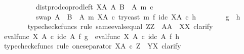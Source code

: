 \begin{isabellebody}
\ \ \ \ \ \ \ \ \ \ dist{\isacharunderscore}{\kern0pt}prod{\isacharunderscore}{\kern0pt}coprod{\isacharunderscore}{\kern0pt}left\ {\isacharparenleft}{\kern0pt}X\isactrlbsup A\isactrlesup {\isacharparenright}{\kern0pt}\ A\ {\isacharparenleft}{\kern0pt}B\ {\isasymsetminus}\ {\isacharparenleft}{\kern0pt}A{\isacharcomma}{\kern0pt}\ m{\isacharparenright}{\kern0pt}{\isacharparenright}{\kern0pt}\ {\isasymcirc}\isactrlsub c\isanewline
\ \ \ \ \ \ \ \ \ \ swap\ {\isacharparenleft}{\kern0pt}A\ {\isasymCoprod}\ {\isacharparenleft}{\kern0pt}B\ {\isasymsetminus}\ {\isacharparenleft}{\kern0pt}A{\isacharcomma}{\kern0pt}\ m{\isacharparenright}{\kern0pt}{\isacharparenright}{\kern0pt}{\isacharparenright}{\kern0pt}\ {\isacharparenleft}{\kern0pt}X\isactrlbsup A\isactrlesup {\isacharparenright}{\kern0pt}\ {\isasymcirc}\isactrlsub c\ try{\isacharunderscore}{\kern0pt}cast\ m\ {\isasymtimes}\isactrlsub f\ id\isactrlsub c\ {\isacharparenleft}{\kern0pt}X\isactrlbsup A\isactrlesup {\isacharparenright}{\kern0pt}{\isacharparenright}{\kern0pt}\isactrlsup {\isasymsharp}\ {\isasymcirc}\isactrlsub c\ h{\isachardoublequoteclose}\isanewline
\isanewline
\ \ \ \ \ \ \isamarkupfalse%
\ {\isachardoublequoteopen}g\ {\isacharequal}{\kern0pt}\ h{\isachardoublequoteclose}\isanewline
\ \ \ \ \ \ \isamarkupfalse%
\ {\isacharparenleft}{\kern0pt}typecheck{\isacharunderscore}{\kern0pt}cfuncs{\isacharcomma}{\kern0pt}\ rule\ same{\isacharunderscore}{\kern0pt}evals{\isacharunderscore}{\kern0pt}equal{\isacharbrackleft}{\kern0pt}\ Z{\isacharequal}{\kern0pt}Z{\isacharcomma}{\kern0pt}\ \ A{\isacharequal}{\kern0pt}A{\isacharcomma}{\kern0pt}\ \ X{\isacharequal}{\kern0pt}X{\isacharbrackright}{\kern0pt}{\isacharcomma}{\kern0pt}\ clarify{\isacharparenright}{\kern0pt}\isanewline
\ \ \ \ \ \ \ \ \isamarkupfalse%
\ {\isachardoublequoteopen}eval{\isacharunderscore}{\kern0pt}func\ X\ A\ {\isasymcirc}\isactrlsub c\ id\isactrlsub c\ A\ {\isasymtimes}\isactrlsub f\ g\ {\isacharequal}{\kern0pt}\ eval{\isacharunderscore}{\kern0pt}func\ X\ A\ {\isasymcirc}\isactrlsub c\ id\isactrlsub c\ A\ {\isasymtimes}\isactrlsub f\ h{\isachardoublequoteclose}\isanewline
\ \ \ \ \ \ \ \ \isamarkupfalse%
\ {\isacharparenleft}{\kern0pt}typecheck{\isacharunderscore}{\kern0pt}cfuncs{\isacharcomma}{\kern0pt}\ rule\ one{\isacharunderscore}{\kern0pt}separator{\isacharbrackleft}{\kern0pt}\ X{\isacharequal}{\kern0pt}{\isachardoublequoteopen}A\ {\isasymtimes}\isactrlsub c\ Z{\isachardoublequoteclose}{\isacharcomma}{\kern0pt}\ \ Y{\isacharequal}{\kern0pt}{\isachardoublequoteopen}X{\isachardoublequoteclose}{\isacharbrackright}{\kern0pt}{\isacharcomma}{\kern0pt}\ clarify{\isacharparenright}{\kern0pt}\isanewline

\end{isabellebody}
